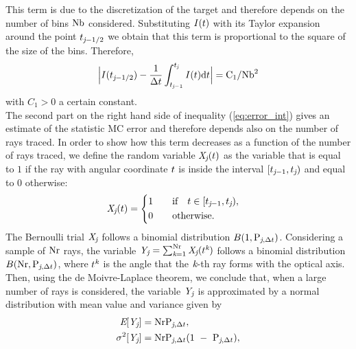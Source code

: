 This term is due to the discretization of the target and therefore depends on the number of bins $\textrm{Nb}$ considered.
  Substituting $I(t)$ with its Taylor expansion around the point $t_{\textit{j}-1/2}$ we obtain that this term is proportional to the square of the size of the bins. 
Therefore,
\begin{equation}\Big|I(t_{\textit{j}-1/2})-\frac{1}{\Delta t}\int_{t_{\textit{j}-1}}^{t_{\textit{j}}} I(t)\textrm{d}t\Big| = \textrm{C}_1/\textrm{Nb}^2\end{equation}
with $C_1>0$ a certain constant. \\
\indent
The second part on the right hand side of inequality (\ref{eq:error_int}) gives an estimate of the statistic MC error and therefore depends also on the
number of rays traced.
In order to show how this term decreases as a function of the number of rays traced,
we define the random variable $\textit{X}_{\textit{j}}(t)$ as the variable that is equal to $1$ if the ray with angular coordinate $t$
is inside the interval $[t_{\textit{j}-1}, t_{\textit{j}})$ and equal to $0$ otherwise:
\begin{equation}
\label{radom_variable}
\textit{X}_{\textit{j}}(t) = \begin{cases} \begin{aligned}
1& \qquad \mbox{if} \quad t\in [t_{\textit{j}-1}, t_{\textit{j}}),\\
0 & \qquad \mbox{otherwise}.
\end{aligned}\end{cases}
\end{equation}
The Bernoulli trial $ \textit{X}_{\textit{j}}$ follows a binomial distribution $B(1,\textrm{P}_{\textit{j}, \Delta t})$.
Considering a sample of $\textrm{Nr}$ rays, the variable $\textit{Y}_{\textit{j}} = \sum_{\textit{k}=1}^{\textrm{Nr}} \textit{X}_{\textit{j}}(t^{\textit{k}})$
follows a binomial distribution $B(\textrm{Nr}, \textrm{P}_{\textit{j},\Delta t})$, where $t^{\textit{k}}$ is the angle that the $\textit{k}$-th ray forms
 with the optical axis. Then, using the de Moivre-Laplace theorem, we conclude that, when a large number of rays is considered, the variable $\textit{Y}_{\textit{j}}$ is approximated by a normal distribution with mean value and variance given by 
\begin{subequations}
\begin{align}
\textit{E}[\textit{Y}_{\textit{j}}] &= \textrm{Nr}\textrm{P}_{\textit{j}, \Delta t}, \\ \sigma^2[\textit{Y}_{\textit{j}}] &= \textrm{Nr}\textrm{P}_{\textit{j}, \Delta t}(1~-~\textrm{P}_{\textit{j}, \Delta t}),\end{align}
\end{subequations}
